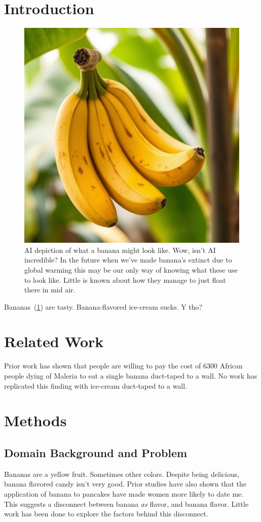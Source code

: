 \documentclass[oneside,openany]{report}
\let\Oldsection\section
\renewcommand{\section}{\FloatBarrier\Oldsection}
\let\Oldsubsection\subsection
\renewcommand{\subsection}{\FloatBarrier\Oldsubsection}
\begin{document}
\section{Introduction}
\label{sec:chapter1_introduction}

\begin{figure}[ht]
 \centering 
 \includegraphics[width=.5\textwidth]{pictures/real_banana.jpeg}
 \caption[Short text description that shows up in the table of contents]{AI depiction of what a banana might look like. Wow, isn't AI incredible? In the future when we've made banana's extinct due to global warming this may be our only way of knowing what these use to look like. Little is known about how they manage to just float there in mid air.}
 \label{fig:banananananananana}
\end{figure}

Bananas~(\cref{fig:banananananananana}) are tasty. Banana-flavored ice-cream sucks. Y tho?


\section{Related Work}
\label{sec:chapter1_related_work}
Prior work has shown that people are willing to pay the cost of 6300 African people dying of Maleria to eat a single banana duct-taped to a wall. No work has replicated this finding with ice-cream duct-taped to a wall.

 
\section{Methods}
\subsection{Domain Background and Problem}
Bananas are a yellow fruit. Sometimes other colors. Despite being delicious, banana flavored candy isn't very good. Prior studies have also shown that the application of banana to pancakes have made women more likely to date me. This suggests a disconnect between banana \emph{as} flavor, and banana flavor. Little work has been done to explore the factors behind this disconnect.
\end{document}
